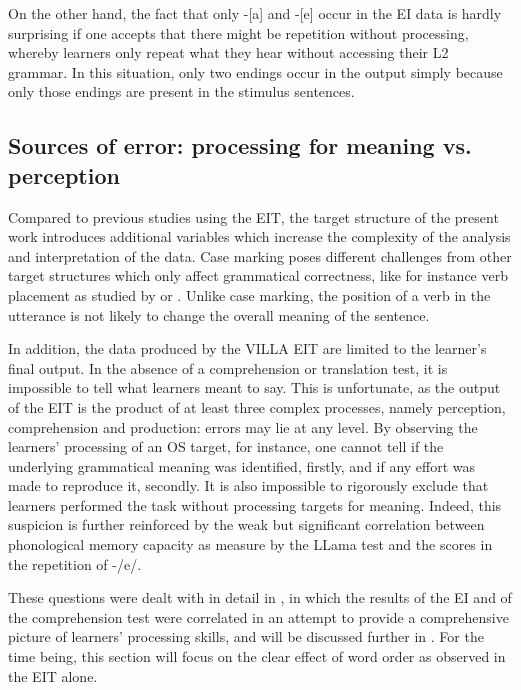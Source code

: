 On the other hand, the fact that only -[a] and -[e] occur in the EI data is hardly surprising if one accepts that there might be repetition without processing, whereby learners only repeat what they hear without accessing their L2 grammar. In this situation, only two endings occur in the output simply because only those endings are present in the stimulus sentences.

\subsection{Sources of error: processing for meaning vs. perception}\label{sec:08:2.2}

Compared to previous studies using the EIT, the target structure of the present work introduces additional variables which increase the complexity of the analysis and interpretation of the data. Case marking poses different challenges from other target structures which only affect grammatical correctness, like for instance verb placement as studied by \citet{Håkansson1989} or \citet{Schimke2011}. Unlike case marking, the position of a verb in the utterance is not likely to change the overall meaning of the sentence. 

In addition, the data produced by the VILLA EIT are limited to the learner’s final output. In the absence of a comprehension or translation test, it is impossible to tell what learners meant to say. This is unfortunate, as the output of the EIT is the product of at least three complex processes, namely perception, comprehension and production: errors may lie at any level. By observing the learners’ processing of an OS target, for instance, one cannot tell if the underlying grammatical meaning was identified, firstly, and if any effort was made to reproduce it, secondly. It is also impossible to rigorously exclude that learners performed the task without processing targets for meaning. Indeed, this suspicion is further reinforced by the weak but significant correlation between phonological memory capacity as measure by the LLama test and the scores in the repetition of -/e/.

These questions were dealt with in detail in , in which the results of the EI and of the comprehension test were correlated in an attempt to provide a comprehensive picture of learners’ processing skills, and will be discussed further in . For the time being, this section will focus on the clear effect of word order as observed in the EIT alone.

